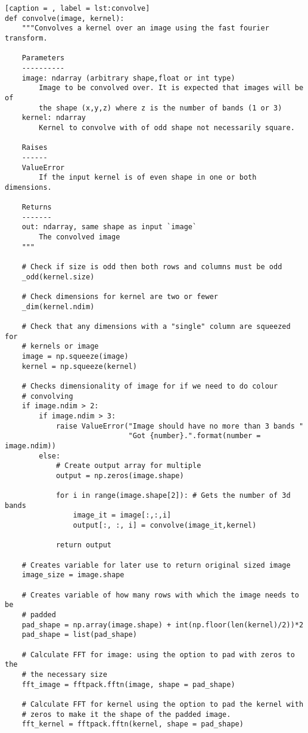 \documentclass[a4paper,10pt]{article}
\begin{document}
\begin{lstlisting}[caption = , label = lst:convolve]
def convolve(image, kernel):
    """Convolves a kernel over an image using the fast fourier transform.

    Parameters
    ----------
    image: ndarray (arbitrary shape,float or int type)
        Image to be convolved over. It is expected that images will be of
        the shape (x,y,z) where z is the number of bands (1 or 3)
    kernel: ndarray
        Kernel to convolve with of odd shape not necessarily square.

    Raises
    ------
    ValueError
        If the input kernel is of even shape in one or both dimensions.

    Returns
    -------
    out: ndarray, same shape as input `image`
        The convolved image
    """

    # Check if size is odd then both rows and columns must be odd
    _odd(kernel.size)

    # Check dimensions for kernel are two or fewer
    _dim(kernel.ndim)

    # Check that any dimensions with a "single" column are squeezed for
    # kernels or image
    image = np.squeeze(image)
    kernel = np.squeeze(kernel)

    # Checks dimensionality of image for if we need to do colour
    # convolving
    if image.ndim > 2:
        if image.ndim > 3:
            raise ValueError("Image should have no more than 3 bands "
                             "Got {number}.".format(number = image.ndim))
        else:
            # Create output array for multiple
            output = np.zeros(image.shape)

            for i in range(image.shape[2]): # Gets the number of 3d bands
                image_it = image[:,:,i]
                output[:, :, i] = convolve(image_it,kernel)

            return output

    # Creates variable for later use to return original sized image
    image_size = image.shape

    # Creates variable of how many rows with which the image needs to be
    # padded
    pad_shape = np.array(image.shape) + int(np.floor(len(kernel)/2))*2
    pad_shape = list(pad_shape)

    # Calculate FFT for image: using the option to pad with zeros to the
    # the necessary size
    fft_image = fftpack.fftn(image, shape = pad_shape)

    # Calculate FFT for kernel using the option to pad the kernel with
    # zeros to make it the shape of the padded image.
    fft_kernel = fftpack.fftn(kernel, shape = pad_shape)


\end{lstlisting}
\end{document}

